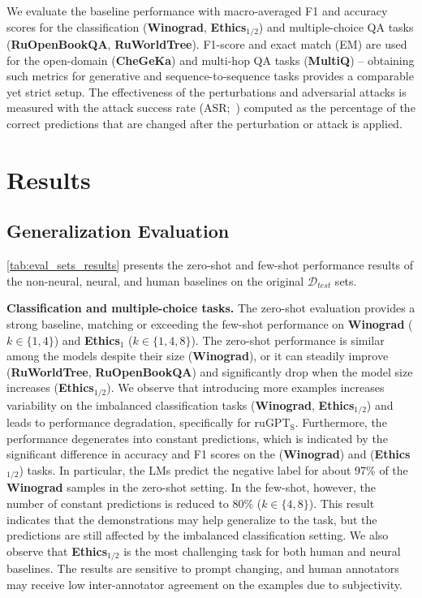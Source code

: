 \documentclass[11pt]{article}
\begin{document}
We evaluate the baseline performance with macro-averaged F1 and accuracy scores for the classification (\textbf{Winograd}, \textbf{Ethics$_{1/2}$}) and multiple-choice QA tasks (\textbf{RuOpenBookQA}, \textbf{RuWorldTree}). F1-score and exact match (EM) are used for the open-domain (\textbf{CheGeKa}) and multi-hop QA tasks (\textbf{MultiQ}) -- obtaining such metrics for generative and sequence-to-sequence tasks provides a comparable yet strict setup. The effectiveness of the perturbations and adversarial attacks is measured with the attack success rate (ASR;~\citealp{wang2021adversarial}) computed as the percentage of the correct predictions that are changed after the perturbation or attack is applied.
 
\section{Results}


\subsection{Generalization Evaluation} \label{sec:generalization}
\autoref{tab:eval_sets_results} presents the zero-shot and few-shot performance results of the non-neural, neural, and human baselines on the original $\mathcal{D}_{test}$ sets.


\vspace{0.1em} \noindent\textbf{Classification and multiple-choice tasks.} The zero-shot evaluation provides a strong baseline, matching or exceeding the few-shot performance on \textbf{Winograd} ($k \in \{1,4\}$) and \textbf{Ethics$_1$} ($k \in \{1,4,8\}$). The zero-shot performance is similar among the models despite their size (\textbf{Winograd}), or it can steadily improve (\textbf{RuWorldTree}, \textbf{RuOpenBookQA}) and significantly drop when the model size increases (\textbf{Ethics$_{1/2}$}). We observe that introducing more examples increases variability on the imbalanced classification tasks (\textbf{Winograd}, \textbf{Ethics$_{1/2}$}) and leads to performance degradation, specifically for ruGPT$_\text{S}$. Furthermore, the performance degenerates into constant predictions, which is indicated by the significant difference in accuracy and F1 scores on the (\textbf{Winograd}) and (\textbf{Ethics$_{1/2}$}) tasks. In particular, the LMs predict the negative label for about 97\% of the \textbf{Winograd} samples in the zero-shot setting. In the few-shot, however, the number of constant predictions is reduced to 80\% ($k \in \{4,8\}$). This result indicates that the demonstrations may help generalize to the task, but the predictions are still affected by the imbalanced classification setting. We also observe that \textbf{Ethics$_{1/2}$} is the most challenging task for both human and neural baselines. The results are sensitive to prompt changing, and human annotators may receive low inter-annotator agreement on the examples due to subjectivity.
\end{document}
